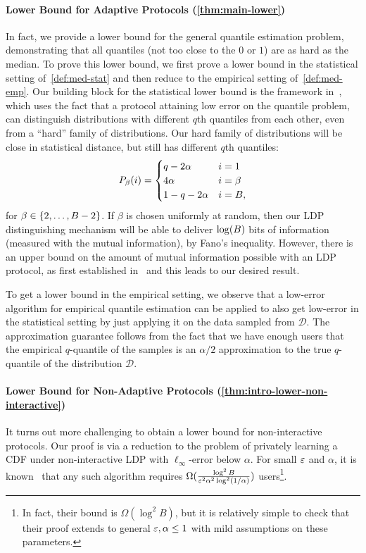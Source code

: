 \paragraph{Lower Bound for Adaptive Protocols (\cref{thm:main-lower})} 
In fact, we provide a lower bound for the general quantile estimation problem, demonstrating that all quantiles (not too close to the $0$ or $1$) are as hard as the median. %
To prove this lower bound, we first prove a lower bound in the statistical setting of~\cref{def:med-stat} and then reduce to the empirical setting of~\cref{def:med-emp}.
Our building block for the statistical lower bound is the framework in~\cite{duchi2013local}, which uses the fact that a protocol attaining low error on the quantile problem, can distinguish distributions with different $q$th quantiles from each other, even from a ``hard'' family of distributions. Our hard family of distributions will be close in statistical distance, but still has different $q$th quantiles:
    \[
        P_\beta(i) = \begin{cases}
        q - 2\alpha & i = 1 \\
        4\alpha & i = \beta \\
        1-q-2\alpha & i = B,
    \end{cases}
    \]
for $\beta \in \{2, \ldots, B-2\}$. If $\beta$ is chosen uniformly at random, then our LDP distinguishing mechanism will be able to deliver $\log(B)$ bits of information (measured with the mutual information), by Fano's inequality. However, there is an upper bound on the amount of mutual information possible with an LDP protocol, as first established in~\cite{duchi2013local} and this leads to our desired result. %

%
%

To get a lower bound in the empirical setting, we observe that a low-error algorithm for empirical quantile estimation can be applied to also get low-error in the statistical setting by just applying it on the data sampled from $\mathcal{D}$. The approximation guarantee follows from the fact that we have enough users that the empirical $q$-quantile of the samples is an $\alpha/2$ approximation to the true $q$-quantile of the distribution $\mathcal{D}$.


\paragraph{Lower Bound for Non-Adaptive Protocols (\cref{thm:intro-lower-non-interactive})}
It turns out more challenging to obtain a lower bound for non-interactive protocols. Our proof is via a reduction to the problem of privately learning a CDF under non-interactive LDP with $\ell_\infty$-error below $\alpha$. For small $\varepsilon$ and $\alpha$, it is known~\cite{edmondsNU20} that any such algorithm requires $\Omega(\frac{\log^2 B}{\varepsilon^2\alpha^2\log^2 (1/\alpha)})$ users\footnote{In fact, their bound is $\Omega(\log^2 B)$, but it is relatively simple to check that their proof extends to general $\varepsilon,\alpha\leq 1$ with mild assumptions on these parameters.}. 

